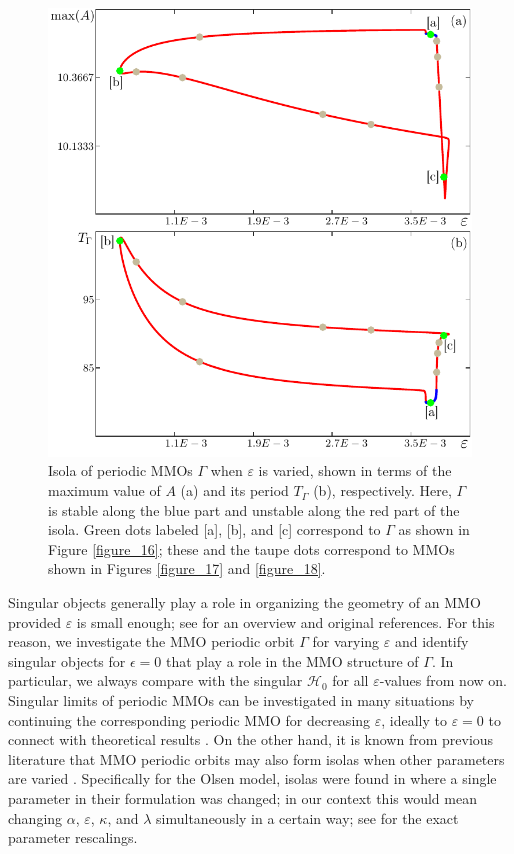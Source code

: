 \documentclass{ws-ijbc}
\begin{document}
\begin{figure}[H]
\centering
\includegraphics[]{./figures/MKMO_15.pdf}
\caption{Isola of periodic MMOs $\Gamma$ when $\varepsilon$ is varied, shown in terms of the maximum value of $A$ (a) and its period $T_\Gamma$ (b), respectively.  Here, $\Gamma$ is stable along the blue part and unstable along the red part of the isola.  Green dots labeled [a], [b], and [c] correspond to $\Gamma$ as shown in Figure \ref{figure_16}; these and the taupe dots correspond to MMOs shown in Figures \ref{figure_17} and \ref{figure_18}.}
\label{figure_15}
\end{figure}

Singular objects generally play a role in organizing the geometry of an MMO provided $\varepsilon$ is small enough; see \cite{MMO} for an overview and original references.  For this reason, we investigate the MMO periodic orbit $\Gamma$ for varying $\varepsilon$ and identify singular objects for $\epsilon=0$ that play a role in the MMO structure of $\Gamma$.  In particular, we always compare with the singular $\mathscr{H}_0$ for all $\varepsilon$-values from now on.  Singular limits of periodic MMOs can be investigated in many situations by continuing the corresponding periodic MMO for decreasing $\varepsilon$, ideally to $\varepsilon=0$ to connect with theoretical results \cite{Nonlinearity, MMO, Autocatalator}.  On the other hand, it is known from previous literature that MMO periodic orbits may also form isolas when other parameters are varied \cite{Nonlinearity, Forest_pest_model}.    Specifically for the Olsen model, isolas were found in \cite{QSSA} where a single parameter in their formulation was changed; in our context this would mean changing $\alpha$, $\varepsilon$, $\kappa$, and $\lambda$ simultaneously in a certain way; see \cite{Rescaling} for the exact parameter rescalings.
\end{document}
